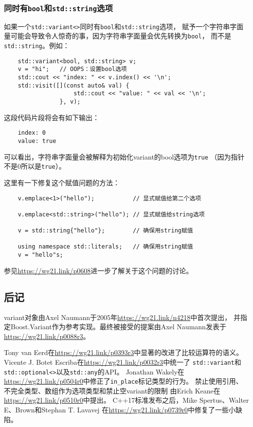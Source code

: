\subsubsection{同时有\texttt{bool}和\texttt{std::string}选项}
如果一个\texttt{std::variant<>}同时有\texttt{bool}和\texttt{std::string}选项，
赋予一个字符串字面量可能会导致令人惊奇的事，因为字符串字面量会优先转换为\texttt{bool}，
而不是\texttt{std::string}。例如：
\begin{lstlisting}
    std::variant<bool, std::string> v;
    v = "hi";   // OOPS：设置bool选项
    std::cout << "index: " << v.index() << '\n';
    std::visit([](const auto& val) {
                    std::cout << "value: " << val << '\n';
                }, v);
\end{lstlisting}
这段代码片段将会有如下输出：
\begin{lstlisting}
    index: 0
    value: true
\end{lstlisting}
可以看出，字符串字面量会被解释为初始化variant的bool选项为\texttt{true}
（因为指针不是0所以是\texttt{true}）。

这里有一下修复这个赋值问题的方法：
\begin{lstlisting}
    v.emplace<1>("hello");           // 显式赋值给第二个选项

    v.emplace<std::string>("hello"); // 显式赋值给string选项

    v = std::string{"hello"};        // 确保用string赋值

    using namespace std::literals;   // 确保用string赋值
    v = "hello"s;
\end{lstlisting}
参见\url{https://wg21.link/p0608}进一步了解关于这个问题的讨论。

\subsection{后记}
variant对象由Axel Naumann于2005年\url{https://wg21.link/n4218}中首次提出，
并指定Boost.Variant作为参考实现。最终被接受的提案由Axel Naumann发表于
\url{https://wg21.link/p0088r3}。

Tony van Eerd在\url{https://wg21.link/p0393r3}中显著的改进了比较运算符的语义。
Vicente J. Botet Escriba在\url{https://wg21.link/p0032r3}中统一了
\texttt{std::variant}和\texttt{std::optional<>}以及\texttt{std::any}的API。
Jonathan Wakely在\url{https://wg21.link/p0504r0}中修正了\texttt{in\_place}标记类型的行为。
禁止使用引用、不完全类型、数组作为选项类型和禁止空variant的限制
由Erich Keane在\url{https://wg21.link/p0510r0}中提出。
C++17标准发布之后，Mike Spertus、Walter E、Brown和Stephan T. Lavavej
在\url{https://wg21.link/p0739r0}中修复了一些小缺陷。

\setcounter{footnote}{0}